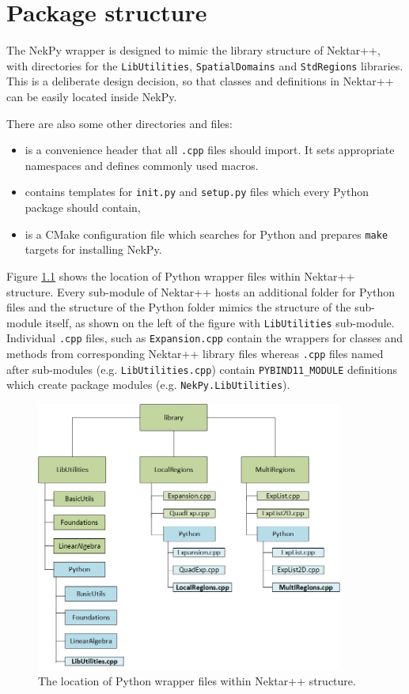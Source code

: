 \chapter{Package structure}

The NekPy wrapper is designed to mimic the library structure of Nektar++, with
directories for the \texttt{LibUtilities}, \texttt{SpatialDomains} and
\texttt{StdRegions} libraries. This is a deliberate design decision, so that
classes and definitions in Nektar++ can be easily located inside NekPy.

There are also some other directories and files:

\begin{itemize}
  \item {} is a convenience header that
  all \texttt{.cpp} files should import. It sets appropriate namespaces and
  defines commonly used macros.
  \item {} contains templates for \texttt{init.py} and
  \texttt{setup.py} files which every Python package should contain,
  \item {} is a CMake configuration file which
  searches for Python and prepares \texttt{make} targets for installing NekPy.
\end{itemize}

Figure \ref{fig:package_str} shows the location of Python wrapper files within
Nektar++ structure.  Every sub-module of Nektar++ hosts an additional folder for
Python files and the structure of the Python folder mimics the structure of the
sub-module itself, as shown on the left of the figure with \texttt{LibUtilities}
sub-module. Individual \texttt{.cpp} files, such as \texttt{Expansion.cpp}
contain the wrappers for classes and methods from corresponding Nektar++ library
files whereas \texttt{.cpp} files named after sub-modules
(e.g. \texttt{LibUtilities.cpp}) contain \texttt{PYBIND11\_MODULE} definitions
which create package modules (e.g. \texttt{NekPy.LibUtilities}).

\begin{figure}[h!]
  \centering
  \includegraphics[width=0.9\textwidth]{img/package_str}
  \caption{The location of Python wrapper files within Nektar++ structure.}
  \label{fig:package_str}
\end{figure}
